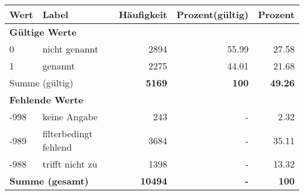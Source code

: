      \begin{longtable}{lXrrr}
     \toprule
     \textbf{Wert} & \textbf{Label} & \textbf{Häufigkeit} & \textbf{Prozent(gültig)} & \textbf{Prozent} \\
     \endhead
     \midrule
     \multicolumn{5}{l}{\textbf{Gültige Werte}}\\

     0 &
     \multicolumn{1}{X}{ nicht genannt   } &


       \num{2894} &
       \num[round-mode=places,round-precision=2]{55.99} &
         \num[round-mode=places,round-precision=2]{27.58} \\

     1 &
     \multicolumn{1}{X}{ genannt   } &


       \num{2275} &
       \num[round-mode=places,round-precision=2]{44.01} &
         \num[round-mode=places,round-precision=2]{21.68} \\
     \midrule
     \multicolumn{2}{l}{Summe (gültig)} &
       \textbf{\num{5169}} &
     \textbf{\num{100}} &
       \textbf{\num[round-mode=places,round-precision=2]{49.26}} \\
     \multicolumn{5}{l}{\textbf{Fehlende Werte}}\\
       -998 &
       keine Angabe &
         \num{243} &
        - &
         \num[round-mode=places,round-precision=2]{2.32} \\
       -989 &
       filterbedingt fehlend &
         \num{3684} &
        - &
         \num[round-mode=places,round-precision=2]{35.11} \\
       -988 &
       trifft nicht zu &
         \num{1398} &
        - &
         \num[round-mode=places,round-precision=2]{13.32} \\
     \midrule
     \multicolumn{2}{l}{\textbf{Summe (gesamt)}} &
          \textbf{\num{10494}} &
        \textbf{-} &
        \textbf{\num{100}} \\
     \bottomrule
     \end{longtable}
     
